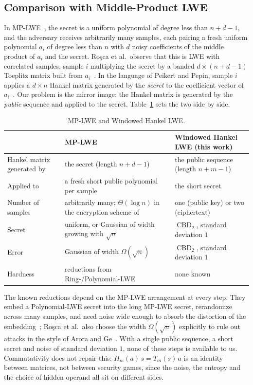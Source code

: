 \documentclass[11pt,a4paper]{article}
\theoremstyle{definition}
\newcommand{\CBD}{\operatorname{CBD}}
\begin{document}
\subsection{Comparison with Middle-Product LWE}\label{sec:mplwe}
In MP-LWE~\cite[Def.~3.5]{rsss2017middle}, the secret is a uniform polynomial of degree less than $n + d - 1$, and the adversary receives arbitrarily many samples, each pairing a fresh uniform polynomial $a_i$ of degree less than $n$ with $d$ noisy coefficients of the middle product of $a_i$ and the secret. Ro\c{s}ca et al.\ observe that this is LWE with correlated samples, sample $i$ multiplying the secret by a banded $d \times (n + d - 1)$ Toeplitz matrix built from $a_i$~\cite[Sect.~3.2]{rsss2017middle}. In the language of Peikert and Pepin, sample $i$ applies a $d \times n$ Hankel matrix generated by the \emph{secret} to the coefficient vector of $a_i$~\cite[Def.~5.1]{peikert2019structured}. Our problem is the mirror image: the Hankel matrix is generated by the \emph{public} sequence and applied to the secret. Table~\ref{tab:mplwe} sets the two side by side.

\begin{table}[H]
\centering
\small
\begin{tabularx}{\textwidth}{lXX}
\toprule
& MP-LWE~\cite{rsss2017middle,peikert2019structured} & Windowed Hankel LWE (this work) \\
\midrule
Hankel matrix generated by & the secret (length $n + d - 1$) & the public sequence (length $n + m - 1$) \\
Applied to & a fresh short public polynomial per sample & the short secret \\
Number of samples & arbitrarily many; $\Theta(\log n)$ in the encryption scheme of~\cite{rsss2017middle} & one (public key) or two (ciphertext) \\
Secret & uniform, or Gaussian of width growing with $\sqrt{n}$~\cite{bai2020mpsign} & $\CBD_2$, standard deviation $1$ \\
Error & Gaussian of width $\Omega(\sqrt{n})$ & $\CBD_2$, standard deviation $1$ \\
Hardness & reductions from Ring-/Polynomial-LWE & none known \\
\bottomrule
\end{tabularx}
\caption{MP-LWE and Windowed Hankel LWE.}
\label{tab:mplwe}
\end{table}

The known reductions depend on the MP-LWE arrangement at every step. They embed a Polynomial-LWE secret into the long MP-LWE secret, rerandomize across many samples, and need noise wide enough to absorb the distortion of the embedding~\cite{rsss2017middle,peikert2019structured,nchiwo2026improved,pelletmary2026unified}; Ro\c{s}ca et al.\ also choose the width $\Omega(\sqrt{n})$ explicitly to rule out attacks in the style of Arora and Ge~\cite[Sect.~4]{rsss2017middle}. With a single public sequence, a short secret and noise of standard deviation $1$, none of these steps is available to us. Commutativity does not repair this: $H_m(a)\,s = T_m(s)\,a$ is an identity between matrices, not between security games, since the noise, the entropy and the choice of hidden operand all sit on different sides.
\end{document}
